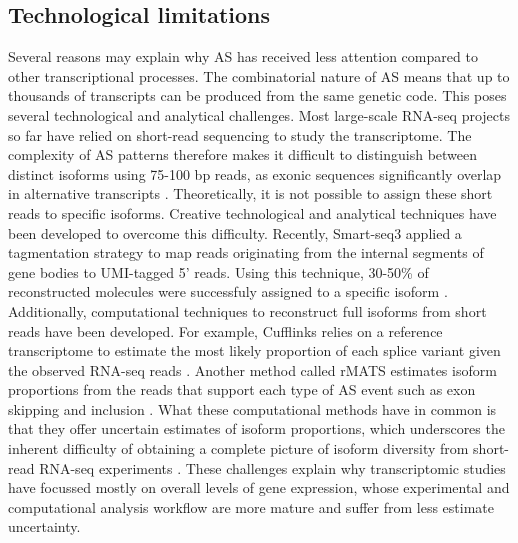 \subsection{Technological limitations}
Several reasons may explain why AS has received less attention compared to other transcriptional processes. The combinatorial nature of AS means that up to thousands of transcripts can be produced from the same genetic code. This poses several technological and analytical challenges. Most large-scale RNA-seq projects so far have relied on short-read sequencing to study the transcriptome. The complexity of AS patterns therefore makes it difficult to distinguish between distinct isoforms using 75-100 bp reads, as exonic sequences significantly overlap in alternative transcripts \cite{Lacroix2008-wq}. Theoretically, it is not possible to assign these short reads to specific isoforms. Creative technological and analytical techniques have been developed to overcome this difficulty. Recently, Smart-seq3 applied a tagmentation strategy to map reads originating from the internal segments of gene bodies to UMI-tagged 5' reads. Using this technique, 30-50\% of reconstructed molecules were successfuly assigned to a specific isoform \cite{Hagemann-Jensen2020-ob}. Additionally, computational techniques to reconstruct full isoforms from short reads have been developed. For example, Cufflinks relies on a reference transcriptome to estimate the most likely proportion of each splice variant given the observed RNA-seq reads \cite{Trapnell2012-zh}. Another method called rMATS estimates isoform proportions from the reads that support each type of AS event such as exon skipping and inclusion \cite{Shen2014-bq}. What these computational methods have in common is that they offer uncertain estimates of isoform proportions, which underscores the inherent difficulty of obtaining a complete picture of isoform diversity from short-read RNA-seq experiments \cite{Shen2014-bq,Katz2010-kl}. These challenges explain why transcriptomic studies have focussed mostly on overall levels of gene expression, whose experimental and computational analysis workflow are more mature and suffer from less estimate uncertainty.

